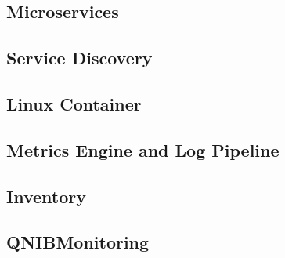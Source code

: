 \subsection{Microservices}



\subsection{Service Discovery}


\subsection{Linux Container}



\subsection{Metrics Engine and Log Pipeline}




\subsection{Inventory}


\subsection{QNIBMonitoring}
